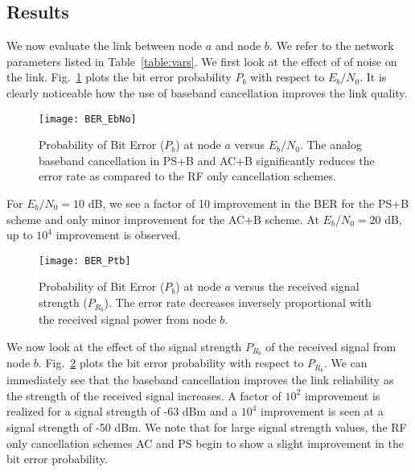 \documentclass[12pt, journal,draftcls,letterpaper,onecolumn]{IEEEtran}
\begin{document}
\subsection{Results}
We now evaluate the link between node $a$ and node $b$.  We refer to the network parameters listed in Table~\ref{table:vars}.  We first look at the effect of of noise on the link.  Fig.~\ref{fig:BER_EbNo} plots the bit error probability $P_b$ with respect to $E_b/N_0$.  It is clearly noticeable how the use of baseband cancellation improves the link quality.   
\begin{figure}[htp] 
\begin{center} 
  \texttt{[image: BER\_EbNo]}
\caption[fig:chan_ang]{Probability of Bit Error ($P_b$) at node $a$ versus $E_b/N_0$.  The analog baseband cancellation in PS+B and AC+B significantly reduces the error rate as compared to the RF only cancellation schemes.} 
  \label{fig:BER_EbNo}
\end{center} 
\end{figure}  
For $E_b/N_0 = 10$ dB, we see a factor of 10 improvement in the BER for the PS+B scheme and only minor improvement for the AC+B scheme. At $E_b/N_0 = 20$ dB, up to $10^4$ improvement is observed.  
  
\begin{figure}[htp]  
\begin{center} 
  \texttt{[image: BER\_Ptb]}
\caption[fig:chan_ang]{Probability of Bit Error ($P_b$) at node $a$ versus the received signal strength ($P_{R_b}$). The error rate decreases inversely proportional with the received signal power from node $b$.}  
  \label{fig:BER_Prb}
\end{center} 
\end{figure} 
We now look at the effect of the signal strength $P_{R_b}$ of the received signal from node $b$.  Fig.~\ref{fig:BER_Prb} plots the bit error probability with respect to $P_{R_b}$.  We can immediately see that the baseband cancellation improves the link reliability as the strength of the received signal increases.  A factor of $10^2$ improvement is realized for a signal strength of -63 dBm and a $10^4$ improvement is seen at a signal strength of -50 dBm.  We note that for large signal strength values, the RF only cancellation schemes AC and PS begin to show a slight improvement in the bit error probability.
\end{document}
